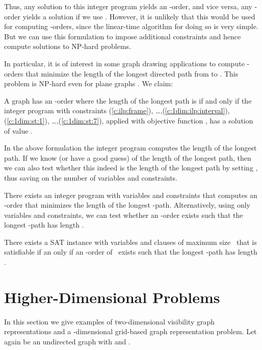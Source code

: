 \documentclass[runningheads]{llncs}
\newcounter{constr}
\begin{document}
Thus, any solution to this integer program yields an -order,
and vice versa, any -order yields a solution if we use .
However, it is unlikely that this would be used for computing -orders,
since the linear-time algorithm for doing so \cite{ET76} is very
simple.  But we can use this formulation to impose additional
constraints and hence compute solutions to NP-hard problems.

In particular, it is of interest in some graph drawing applications
to compute -orders that minimize the length of the longest
directed path from  to .  This problem is NP-hard even for
plane graphs \cite{SZ10}.
We claim:
\newcommand{\lemMinStText}{A graph  has an -order where the length of the longest path
is  if and only if the integer program
with constraints (\ref{c:ilp:frame}),
\ldots,(\ref{c:1dim:ilp:interval}),
(\ref{c:1dim:st:1}),
\ldots,(\ref{c:1dim:st:7}),
 applied with 
objective function , has a solution
of value .}
\begin{lemma}
 \lemMinStText
 \label{le:minSt}
\end{lemma}
In the above formulation the integer program computes the length
of the longest path.  If we know (or have a good guess) of the length
 of the longest path, then we can also test whether this indeed
is the length of the longest path by setting ,
thus saving on the number of variables and constraints.

\begin{theorem}
There exists an integer program with  variables
and constraints that computes an -order that minimizes
the length of the longest -path.  Alternatively, using only
 variables and constraints, we can test whether
an -order exists such that the longest -path has length .
\end{theorem}
\begin{theorem}
There exists a SAT instance with  variables
and  clauses of maximum size~
that is satisfiable if an only if
an -order of~ exists such that the longest -path has length .
\end{theorem}


\fi


\section{Higher-Dimensional Problems}\label{sec:higherdim}
In this section we give examples of two-dimensional visibility graph representations and a -dimensional grid-based graph representation problem. Let again  be an undirected graph with  and .
\end{document}
